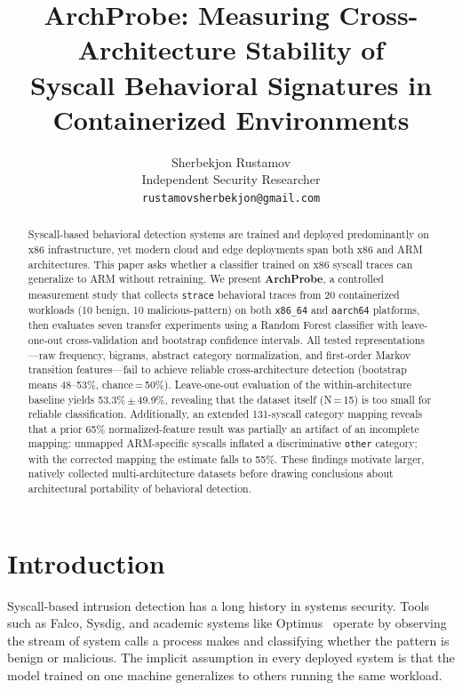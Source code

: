 \documentclass[10pt,twocolumn]{article}
\title{\textbf{ArchProbe: Measuring Cross-Architecture Stability of\\
Syscall Behavioral Signatures in Containerized Environments}}
\author{
  Sherbekjon Rustamov \\
  Independent Security Researcher \\
  \texttt{rustamovsherbekjon@gmail.com}
}
\date{}
\begin{document}
\maketitle

\begin{abstract}
Syscall-based behavioral detection systems are trained and deployed
predominantly on x86 infrastructure, yet modern cloud and edge deployments
span both x86 and ARM architectures. This paper asks whether a classifier
trained on x86 syscall traces can generalize to ARM without retraining.
We present \textbf{ArchProbe}, a controlled measurement study that collects
\texttt{strace} behavioral traces from 20 containerized workloads (10 benign,
10 malicious-pattern) on both \texttt{x86\_64} and \texttt{aarch64} platforms,
then evaluates seven transfer experiments using a Random Forest classifier with
leave-one-out cross-validation and bootstrap confidence intervals. All tested
representations---raw frequency, bigrams, abstract category normalization, and
first-order Markov transition features---fail to achieve reliable
cross-architecture detection (bootstrap means 48--53\%, chance\,=\,50\%).
Leave-one-out evaluation of the within-architecture baseline yields
53.3\%\,$\pm$\,49.9\%, revealing that the dataset itself (N\,=\,15) is too
small for reliable classification. Additionally, an extended 131-syscall
category mapping reveals that a prior 65\% normalized-feature result was
partially an artifact of an incomplete mapping: unmapped ARM-specific syscalls
inflated a discriminative \texttt{other} category; with the corrected mapping
the estimate falls to 55\%. These findings motivate larger, natively collected
multi-architecture datasets before drawing conclusions about architectural
portability of behavioral detection.
\end{abstract}

\section{Introduction}

Syscall-based intrusion detection has a long history in systems security.
Tools such as Falco, Sysdig, and academic systems like Optimus~\cite{optimus}
operate by observing the stream of system calls a process makes and classifying
whether the pattern is benign or malicious. The implicit assumption in every
deployed system is that the model trained on one machine generalizes to others
running the same workload.
\end{document}
